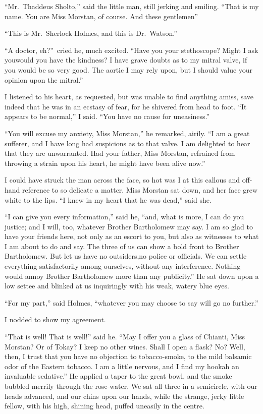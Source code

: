 \documentclass[12pt,english,oneside]{book}
\begin{document}
{}``Mr.\ Thaddeus Sholto,'' said the little man, still jerking
and smiling. {}``That is my name. You are Miss Morstan, of course.
And these gentlemen\mdsh{---}''

{}``This is Mr.\ Sherlock Holmes, and this is Dr.\ Watson.''

{}``A doctor, eh?''\ cried he, much excited. {}``Have you your
stethoscope? Might I ask you\mdsh{---}would you have the kindness?
I have grave doubts as to my mitral valve, if you would be so very
good. The aortic I may rely upon, but I should value your opinion
upon the mitral.''

I listened to his heart, as requested, but was unable to find anything
amiss, save indeed that he was in an ecstasy of fear, for he shivered
from head to foot. {}``It appears to be normal,'' I said. {}``You
have no cause for uneasiness.''

{}``You will excuse my anxiety, Miss Morstan,'' he remarked, airily.
{}``I am a great sufferer, and I have long had suspicions as to that
valve. I am delighted to hear that they are unwarranted. Had your
father, Miss Morstan, refrained from throwing a strain upon his heart,
he might have been alive now.''

I could have struck the man across the face, so hot was I at this
callous and off-hand reference to so delicate a matter. Miss Morstan
sat down, and her face grew white to the lips. {}``I knew in my heart
that he was dead,'' said she.

{}``I can give you every information,'' said he, {}``and, what
is more, I can do you justice; and I will, too, whatever Brother Bartholomew
may say. I am so glad to have your friends here, not only as an escort
to you, but also as witnesses to what I am about to do and say. The
three of us can show a bold front to Brother Bartholomew. But let
us have no outsiders,\mdsh{---}no police or officials. We can settle
everything satisfactorily among ourselves, without any interference.
Nothing would annoy Brother Bartholomew more than any publicity.''
He sat down upon a low settee and blinked at us inquiringly with his
weak, watery blue eyes.

{}``For my part,'' said Holmes, {}``whatever you may choose to
say will go no further.''

I nodded to show my agreement.

{}``That is well! That is well!'' said he. {}``May I offer you
a glass of Chianti, Miss Morstan? Or of Tokay? I keep no other wines.
Shall I open a flask? No? Well, then, I trust that you have no objection
to tobacco-smoke, to the mild balsamic odor of the Eastern tobacco.
I am a little nervous, and I find my hookah an invaluable sedative.''
He applied a taper to the great bowl, and the smoke bubbled merrily
through the rose-water. We sat all three in a semicircle, with our
heads advanced, and our chins upon our hands, while the strange, jerky
little fellow, with his high, shining head, puffed uneasily in the
centre.
\end{document}
